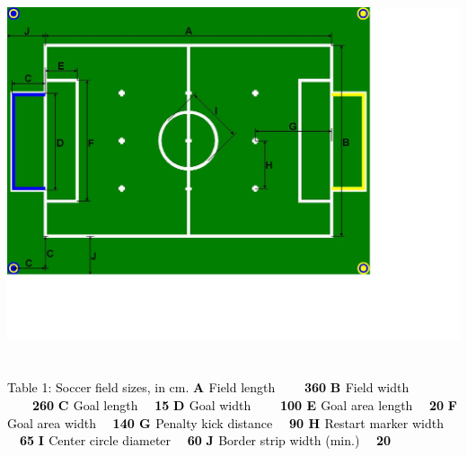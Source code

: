 \documentclass[a4paper]{article}
\begin{document}
{\centering
\includegraphics[width=16.058cm,height=11.85cm]{img/HELSI_rules_2025-img001.jpg}
}
\textcolor{black}{Table 1: Soccer field sizes, in cm.}\newline
\textbf{\textcolor{black}{ A }}\textcolor{black}{Field length \ \ \ \ }\textbf{\textcolor{black}{360}}\newline
\textbf{\textcolor{black}{ B }}\textcolor{black}{Field width \ \ \ \ }\textbf{\textcolor{black}{260}}\newline
\textbf{\textcolor{black}{ C }}\textcolor{black}{Goal length \ \ }\textbf{\textcolor{black}{15}}\newline
\textbf{\textcolor{black}{ D }}\textcolor{black}{Goal width \ \ \ \ }\textbf{\textcolor{black}{100\newline
 E }}\textcolor{black}{Goal area length \ \ }\textbf{\textcolor{black}{20}}\newline
\textbf{\textcolor{black}{ F }}\textcolor{black}{Goal area width \ \ }\textbf{\textcolor{black}{140\newline
G }}\textcolor{black}{Penalty kick distance \ \ }\textbf{\textcolor{black}{90\newline
H }}\textcolor{black}{Restart marker width \ \ }\textbf{\textcolor{black}{65}}\newline
\textbf{\textcolor{black}{ I }}\textcolor{black}{Center circle diameter \ \ }\textbf{\textcolor{black}{60}}\newline
\textbf{\textcolor{black}{ J }}\textcolor{black}{Border strip width (min.) \ \ }\textbf{\textcolor{black}{20}}
\end{document}
